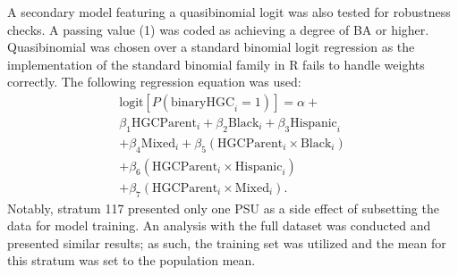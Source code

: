 \documentclass[jou,12pt,floatsintext]{apa7}
\begin{document}
A secondary model featuring a quasibinomial logit was also tested for robustness checks. A passing value (1) was coded as achieving a degree of BA or higher. Quasibinomial was chosen over a standard binomial logit regression as the implementation of the standard binomial family in R fails to handle weights correctly. The following regression equation was used:
\begin{multline}
  \label{eq:Reg2}
  \text{logit}\left[P(\text{binaryHGC}_i=1)\right] =
  \alpha + \\
  \beta_1 \text{HGCParent}_i
  + \beta_2 \text{Black}_i
  + \beta_3 \text{Hispanic}_i\\
  + \beta_4 \text{Mixed}_i
  + \beta_5 (\text{HGCParent}_i \times \text{Black}_i)\\
  + \beta_6 (\text{HGCParent}_i \times \text{Hispanic}_i)\\
  + \beta_7 (\text{HGCParent}_i \times \text{Mixed}_i).
\end{multline}
Notably, stratum 117 presented only one PSU as a side effect of subsetting the data for model training. An analysis with the full dataset was conducted and presented similar results; as such, the training set was utilized and the mean for this stratum was set to the population mean.
\end{document}
